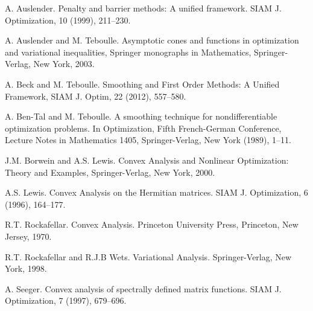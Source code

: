 \documentclass[a4paper,11pt]{jsarticle}
\theoremstyle{definition}
\begin{document}
\begin{thebibliography}{99}
    A. Auslender. Penalty and barrier methods: A unified framework. SIAM J. Optimization, 10 (1999), 211--230.

  A. Auslender and M. Teboulle. Asymptotic cones and functions in optimization and variational inequalities, Springer monographs in Mathematics, Springer-Verlag, New York, 2003.

  A. Beck and M. Teboulle. Smoothing and First Order Methods: A Unified Framework, SIAM J. Optim, 22 (2012), 557--580.

  A. Ben-Tal and M. Teboulle. A smoothing technique for nondifferentiable optimization problems. In Optimization, Fifth French-German Conference, Lecture Notes in Mathematics 1405, Springer-Verlag, New York (1989), 1--11.

  J.M. Borwein and A.S. Lewis. Convex Analysis and Nonlinear Optimization: Theory and Examples, Springer-Verlag, New York, 2000.

  A.S. Lewis. Convex Analysis on the Hermitian matrices. SIAM J. Optimization, 6 (1996), 164--177.

  R.T. Rockafellar. Convex Analysis. Princeton University Press, Princeton, New Jersey, 1970.

  R.T. Rockafellar and R.J.B Wets. Variational Analysis. Springer-Verlag, New York, 1998.

  A. Seeger. Convex analysis of spectrally defined matrix functions. SIAM J. Optimization, 7 (1997), 679--696.

  \end{thebibliography}
\end{document}
